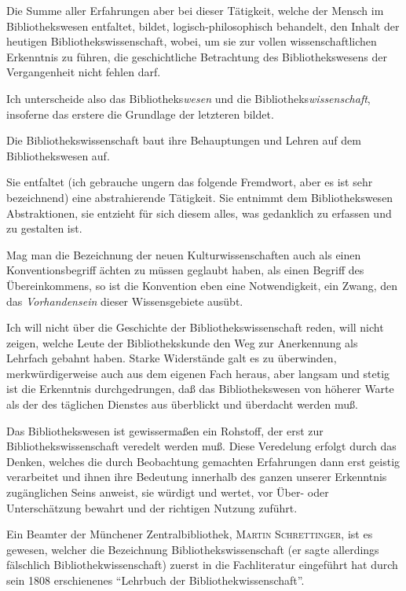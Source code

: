 \documentclass[a4paper,
fontsize=11pt,
oneside,
numbers=noperiodatend,
parskip=half-,
bibliography=totoc,
final
]{scrartcl}
\begin{document}
Die Summe aller Erfahrungen aber bei dieser Tätigkeit, welche der Mensch
im Bibliothekswesen entfaltet, bildet, logisch-philosophisch behandelt,
den Inhalt der heutigen Bibliothekswissenschaft, wobei, um sie zur
vollen wissenschaftlichen Erkenntnis zu führen, die geschichtliche
Betrachtung des Bibliothekswesens der Vergangenheit nicht fehlen darf.

Ich unterscheide also das Bibliotheks\emph{wesen} und die
Bibliotheks\emph{wissenschaft}, insoferne das erstere die Grundlage der
letzteren bildet.

Die Bibliothekswissenschaft baut ihre Behauptungen und Lehren auf dem
Bibliothekswesen auf.

Sie entfaltet (ich gebrauche ungern das folgende Fremdwort, aber es ist
sehr bezeichnend) eine abstrahierende Tätigkeit. Sie entnimmt dem
Bibliothekswesen Abstraktionen, sie entzieht für sich diesem alles, was
gedanklich zu erfassen und zu gestalten ist.

Mag man die Bezeichnung der neuen Kulturwissenschaften auch als einen
Konventionsbegriff ächten zu müssen geglaubt haben, als einen Begriff
des Übereinkommens, so ist die Konvention eben eine Notwendigkeit, ein
Zwang, den das \emph{Vorhandensein} dieser Wissensgebiete ausübt.

Ich will nicht über die Geschichte der Bibliothekswissenschaft reden,
will nicht zeigen, welche Leute der Bibliothekskunde den Weg zur
Anerkennung als Lehrfach gebahnt haben. Starke Widerstände galt es zu
überwinden, merkwürdigerweise auch aus dem eigenen Fach heraus, aber
langsam und stetig ist die Erkenntnis durchgedrungen, daß das
Bibliothekswesen von höherer Warte als der des täglichen Dienstes aus
überblickt und überdacht werden muß.

Das Bibliothekswesen ist gewissermaßen ein Rohstoff, der erst zur
Bibliothekswissenschaft veredelt werden muß. Diese Veredelung erfolgt
durch das Denken, welches die durch Beobachtung gemachten Erfahrungen
dann erst geistig verarbeitet und ihnen ihre Bedeutung innerhalb des
ganzen unserer Erkenntnis zugänglichen Seins anweist, sie würdigt und
wertet, vor Über- oder Unterschätzung bewahrt und der richtigen Nutzung
zuführt.

Ein Beamter der Münchener Zentralbibliothek, \textsc{Martin
Schrettinger}, ist es gewesen, welcher die Bezeichnung
Bibliothekswissenschaft (er sagte allerdings fälschlich
Bibliothekwissenschaft) zuerst in die Fachliteratur eingeführt hat durch
sein 1808 erschienenes \enquote{Lehrbuch der Bibliothekwissenschaft}.
\end{document}
